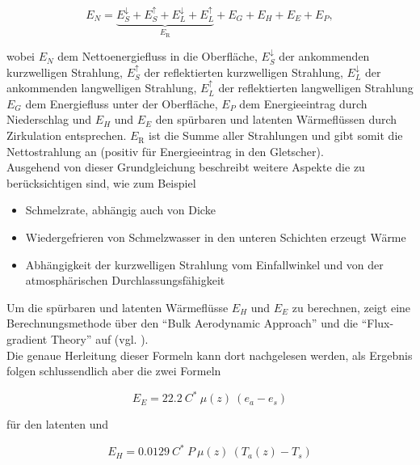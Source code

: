 \documentclass[12pt,a4paper]{article}
\begin{document}
\begin{equation}
E_{N}=\underbrace{E_{S}^{\downarrow}+E_{S}^{\uparrow}+E_{L}^{\downarrow}+E_{L}^{\uparrow}}_{E_{\mathrm{R}}}+E_{G}+E_{H}+E_{E}+E_{P},
\end{equation}

wobei $E_{N}$ dem Nettoenergiefluss in die Oberfläche, $E_{S}^{\downarrow}$ der ankommenden kurzwelligen Strahlung, $E_{S}^{\uparrow}$ der reflektierten kurzwelligen Strahlung, $E_{L}^{\downarrow}$ der ankommenden langwelligen Strahlung, $E_{L}^{\uparrow}$ der reflektierten langwelligen Strahlung $E_{G}$ dem Energiefluss unter der Oberfläche, $E_{P}$ dem Energieeintrag durch Niederschlag und $E_{H}$ und $E_{E}$ den spürbaren und latenten Wärmeflüssen durch Zirkulation entsprechen. $E_{\mathrm{R}}$ ist die Summe aller Strahlungen und gibt somit die Nettostrahlung an (positiv für Energieeintrag in den Gletscher).\\

Ausgehend von dieser Grundgleichung beschreibt \citeauthor{ThePhysicsOfGlaciers} weitere Aspekte die zu berücksichtigen sind, wie zum Beispiel 

\begin{itemize}
\item{Schmelzrate, abhängig auch von Dicke }
\item{Wiedergefrieren von Schmelzwasser in den unteren Schichten erzeugt Wärme}
\item{Abhängigkeit der kurzwelligen Strahlung vom Einfallwinkel und von der atmosphärischen Durchlassungsfähigkeit}
\end{itemize}

Um die spürbaren und latenten Wärmeflüsse $E_{H}$ und $E_{E}$ zu berechnen, zeigt \citeauthor{ThePhysicsOfGlaciers} eine Berechnungsmethode über den ``Bulk Aerodynamic Approach'' und die ``Flux-gradient Theory'' auf (vgl. \cite[153-157]{ThePhysicsOfGlaciers}).\\
Die genaue Herleitung dieser Formeln kann dort nachgelesen werden, als Ergebnis folgen schlussendlich aber die zwei Formeln

\begin{equation}\label{Berechnung latenter Energiefluss}
E_{E}= 22.2~C^*~\mu(z)~(e_a-e_s)
\end{equation}

für den latenten und

\begin{equation}\label{Berechnung sensibler Energiefluss}
E_{H}= 0.0129~C^*~P~\mu(z)~(T_a(z)-T_s)
\end{equation}
\end{document}
